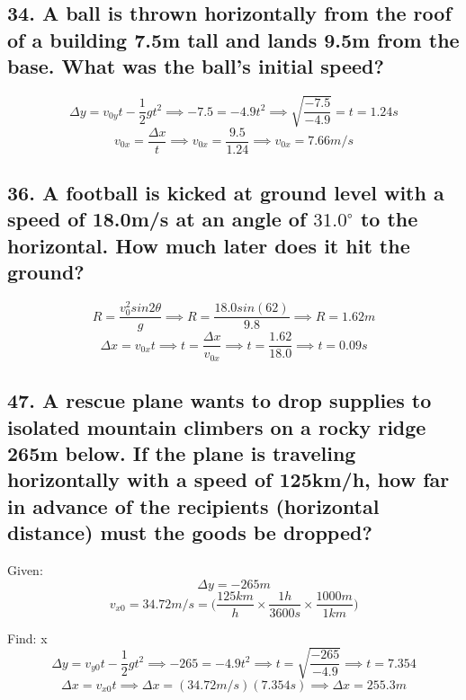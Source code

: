 \documentclass[12pt,a4paper,english]{article}
\newcommand{\degree}[1]{${#1}^\circ$}
\begin{document}
\begin{flushleft}
  \subsection{34. A ball is thrown horizontally from the roof of a building 7.5m tall and lands 9.5m from the base. What was the ball's initial speed?}
  \[
    \Delta y=v_{0y}t-\frac{1}{2}gt^2 \implies 
    -7.5=-4.9t^2\implies
    \sqrt{\frac{-7.5}{-4.9}}=t=1.24s
  \]
  \[
  v_{0x}=\frac{\Delta x}{t}\implies
  v_{0x}=\frac{9.5}{1.24}\implies
  v_{0x}=7.66m/s
  \]
  \subsection{36. A football is kicked at ground level with a speed of 18.0m/s at an angle of \degree{31.0} to the horizontal. How much later does it hit the ground?}
\[
  R=\frac{v_0^2sin2\theta}{g}\implies
  R=\frac{18.0sin(62)}{9.8}\implies
  R=1.62m
\]
\[
  \Delta x=v_{0x}t\implies
  t=\frac{\Delta x}{v_{0x}}\implies
  t=\frac{1.62}{18.0}\implies
  t=0.09s
\]
  \subsection{47. A rescue plane wants to drop supplies to isolated mountain climbers on a rocky ridge 265m below. If the plane is traveling horizontally with a speed of 125km/h, how far in advance of the recipients (horizontal distance) must the goods be dropped?}
  Given:
\[
  \Delta y = -265m
\]
  \[
  v_{x0} =34.72m/s=\biggr( \frac{125km}{h} \times \frac{1h}{3600s}\times \frac{1000m}{1km}\biggr)
\]

Find: \Delta x\\
\[
  \Delta y=v_{y0}t-\frac{1}{2}gt^2\implies
  -265=-4.9t^2\implies
  t=\sqrt{\frac{-265}{-4.9}}\implies
  t=7.354
\]
\[
  \Delta x=v_{x0}t\implies
  \Delta x=(34.72m/s)(7.354s)\implies
  \Delta x=255.3m
\]
\end{flushleft}
\end{document}
